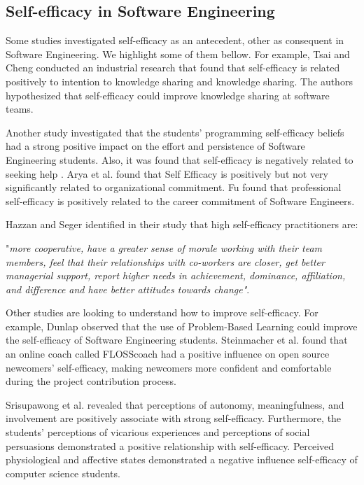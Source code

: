 \documentclass{TheMartianReport}
\begin{document}
\subsection{Self-efficacy in Software Engineering}
Some studies investigated self-efficacy as an antecedent, other as consequent in Software Engineering. We highlight some of them bellow. For example, Tsai and Cheng \cite{tsai2010programmer} conducted an industrial research that found that self-efficacy is related positively to intention to knowledge sharing and knowledge sharing. The authors hypothesized that self-efficacy could improve knowledge sharing at software teams.

Another study investigated that the students' programming self-efficacy beliefs had a strong positive impact on the effort and persistence of Software Engineering students. Also, it was found that self-efficacy is negatively related to seeking help \cite{kanaparan2017self}. Arya et al.\cite{arya2012moderating} found that Self Efficacy is positively but not very significantly related to organizational commitment. Fu \cite{fu2010information} found that professional self-efficacy is positively related to the career commitment of Software Engineers. 

Hazzan and Seger \cite{hazzan2010recruiting} identified in their study that high self-efficacy practitioners are:

"\textit{more cooperative, have a greater sense of morale working with their team members, feel that their relationships with co-workers are closer, get better managerial support, report higher needs in achievement, dominance, affiliation, and difference and have better attitudes towards change"}. 


Other studies are looking to understand how to improve self-efficacy. For example, Dunlap \cite{dunlap2005problem} observed that the use of Problem-Based Learning could improve the self-efficacy of Software Engineering students. Steinmacher et al. \cite{steinmacher2015increasing} found that an online coach called FLOSScoach had a positive influence on open source newcomers' self-efficacy, making newcomers more confident and comfortable during the project contribution process.

Srisupawong et al. \cite{srisupawong2018relationship} revealed that perceptions of autonomy, meaningfulness, and involvement are positively associate with strong self-efficacy. Furthermore, the students' perceptions of vicarious experiences and perceptions of social persuasions demonstrated a positive relationship with self-efficacy. Perceived physiological and affective states demonstrated a negative influence self-efficacy of computer science students.
 
\end{document}
